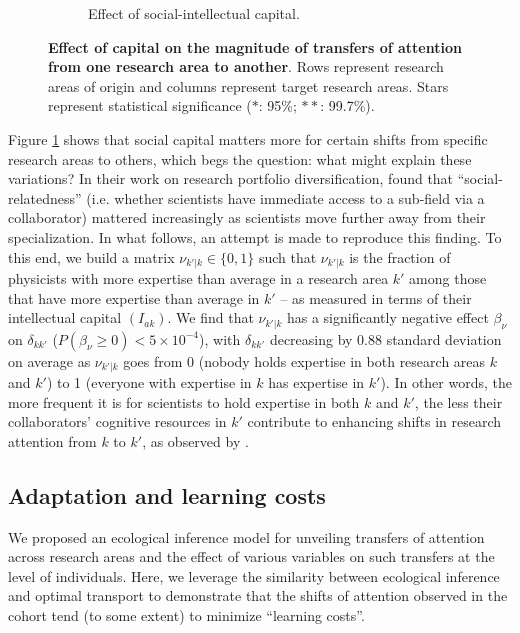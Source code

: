\documentclass{article}
\begin{document}
\begin{figure}[h]
\begin{subfigure}{.5\textwidth}
    \caption{Effect of social-intellectual capital.}
    \label{fig:social-capital-effect}
\end{subfigure}
\caption{\textbf{Effect of capital on the magnitude of transfers of attention from one research area to another}. Rows represent research areas of origin and columns represent target research areas. Stars represent statistical significance ($\ast$: 95\%; $\ast\ast$: 99.7\%).}
\label{fig:test}
\end{figure}

Figure \ref{fig:social-capital-effect} shows that social capital matters more for certain shifts from specific research areas to others, which begs the question: what might explain these variations? In their work on research portfolio diversification, \citet{Tripodi2020} found that ``social-relatedness'' (i.e. whether scientists have immediate access to a sub-field via a collaborator) mattered increasingly as scientists move further away from their specialization. In what follows, an attempt is made to reproduce this finding. To this end, we build a matrix $\nu_{k'|k}\in\{0,1\}$ such that $\nu_{k'|k}$ is the fraction of physicists with more expertise than average in a research area $k'$ among those that have more expertise than average in $k'$ -- as measured in terms of their intellectual capital $(I_{ak})$. We find that $\nu_{k'|k}$ has a significantly negative effect $\beta_\nu$ on $\delta_{kk'}$ ($P(\beta_\nu\geq 0)<5\times 10^{-4}$), with $\delta_{kk'}$ decreasing by 0.88 standard deviation on average as $\nu_{k'|k}$ goes from 0 (nobody holds expertise in both research areas $k$ and $k'$) to 1 (everyone with expertise in $k$ has expertise in $k'$). In other words, the more frequent it is for scientists to hold expertise in both $k$ and $k'$, the less their collaborators' cognitive resources in $k'$ contribute to enhancing shifts in research attention from $k$ to $k'$, as observed by \citet{Tripodi2020}.

\subsection{\label{sec:optimal-transport}Adaptation and learning costs}

We proposed an ecological inference model for unveiling transfers of attention across research areas and the effect of various variables on such transfers at the level of individuals. Here, we leverage the similarity between ecological inference and optimal transport \citep{muzellec2017tsallis,li2019learning} to demonstrate that the shifts of attention observed in the cohort tend (to some extent) to minimize ``learning costs''. 
\end{document}
